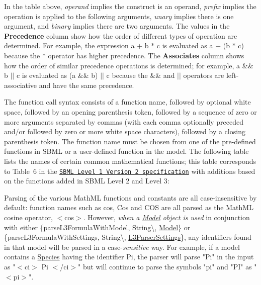 In the table above, {\itshape operand} implies the construct is an operand, {\itshape prefix} implies the operation is applied to the following arguments, {\itshape unary} implies there is one argument, and {\itshape binary} implies there are two arguments. The values in the {\bfseries Precedence} column show how the order of different types of operation are determined. For example, the expression {\ttfamily a + b $\ast$ c} is evaluated as {\ttfamily a + (b $\ast$ c)} because the {\ttfamily $\ast$} operator has higher precedence. The {\bfseries Associates} column shows how the order of similar precedence operations is determined; for example, {\ttfamily a \&\& b $\vert$$\vert$ c} is evaluated as {\ttfamily (a \&\& b) $\vert$$\vert$ c} because the {\ttfamily \&\&} and {\ttfamily $\vert$$\vert$} operators are left-\/associative and have the same precedence.

The function call syntax consists of a function name, followed by optional white space, followed by an opening parenthesis token, followed by a sequence of zero or more arguments separated by commas (with each comma optionally preceded and/or followed by zero or more white space characters), followed by a closing parenthesis token. The function name must be chosen from one of the pre-\/defined functions in S\+B\+ML or a user-\/defined function in the model. The following table lists the names of certain common mathematical functions; this table corresponds to Table~6 in the \href{http://sbml.org/Documents/Specifications#SBML_Level_1_Version_2}{\tt S\+B\+ML Level~1 Version~2 specification} with additions based on the functions added in S\+B\+ML Level 2 and Level 3\+:



Parsing of the various Math\+ML functions and constants are all case-\/insensitive by default\+: function names such as {\ttfamily cos}, {\ttfamily Cos} and {\ttfamily C\+OS} are all parsed as the Math\+ML cosine operator, {\ttfamily $<$cos$>$}. However, {\itshape when a \hyperlink{class_model}{Model} object is used} in conjunction with either \{parse\+L3\+Formula\+With\+Model, String\textbackslash{}, \hyperlink{class_model}{Model}\} or \{parse\+L3\+Formula\+With\+Settings, String\textbackslash{}, \hyperlink{class_l3_parser_settings}{L3\+Parser\+Settings}\}, any identifiers found in that model will be parsed in a case-\/{\itshape sensitive} way. For example, if a model contains a \hyperlink{class_species}{Species} having the identifier {\ttfamily Pi}, the parser will parse "{\ttfamily Pi}" in the input as "{\ttfamily $<$ci$>$ Pi $<$/ci$>$}" but will continue to parse the symbols "{\ttfamily pi}" and "{\ttfamily PI}" as "{\ttfamily $<$pi$>$}".

